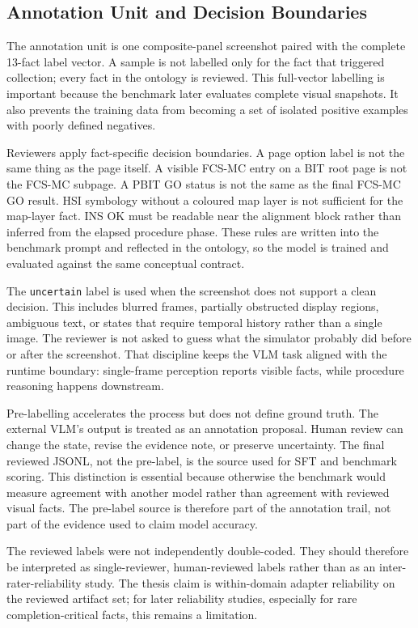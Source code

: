 \subsection{Annotation Unit and Decision Boundaries}

The annotation unit is one composite-panel screenshot paired with the complete
13-fact label vector. A sample is not labelled only for the fact that triggered
collection; every fact in the ontology is reviewed. This full-vector labelling
is important because the benchmark later evaluates complete visual snapshots.
It also prevents the training data from becoming a set of isolated positive
examples with poorly defined negatives.

Reviewers apply fact-specific decision boundaries. A page option label is not
the same thing as the page itself. A visible FCS-MC entry on a BIT root page is
not the FCS-MC subpage. A PBIT GO status is not the same as the final FCS-MC GO
result. HSI symbology without a coloured map layer is not sufficient for the
map-layer fact. INS OK must be readable near the alignment block rather
than inferred from the elapsed procedure phase. These rules are written into
the benchmark prompt and reflected in the ontology, so the model is trained and
evaluated against the same conceptual contract.

The \texttt{uncertain} label is used when the screenshot does not support a
clean decision. This includes blurred frames, partially obstructed display
regions, ambiguous text, or states that require temporal history rather than a
single image. The reviewer is not asked to guess what the simulator probably
did before or after the screenshot. That discipline keeps the VLM task aligned
with the runtime boundary: single-frame perception reports visible facts, while
procedure reasoning happens downstream.

Pre-labelling accelerates the process but does not define ground truth. The
external VLM's output is treated as an annotation proposal. Human review can
change the state, revise the evidence note, or preserve uncertainty. The final
reviewed JSONL, not the pre-label, is the source used for SFT and benchmark
scoring. This distinction is essential because otherwise the benchmark would
measure agreement with another model rather than agreement with reviewed visual
facts. The pre-label source is therefore part of the annotation trail, not part
of the evidence used to claim model accuracy.

The reviewed labels were not independently double-coded. They should therefore
be interpreted as single-reviewer, human-reviewed labels rather than as an
inter-rater-reliability study. The thesis claim is within-domain adapter
reliability on the reviewed artifact set; for later reliability studies,
especially for rare completion-critical facts, this remains a limitation.

